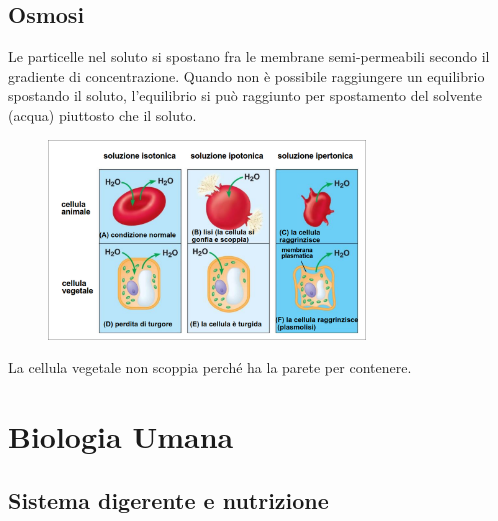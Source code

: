 \documentclass[a4paper]{article}
\begin{document}
\pagebreak

\subsection{Osmosi}

Le particelle nel soluto si spostano fra le membrane semi-permeabili secondo il gradiente
di concentrazione. Quando non è possibile raggiungere un equilibrio spostando il soluto,
l'equilibrio si può raggiunto per spostamento del solvente (acqua) piuttosto che il soluto.



\begin{figure}[th]
    \centering
    \includegraphics[width=0.75\textwidth]{./equilibrio_idrico.png}
\end{figure}

La cellula vegetale non scoppia perché ha la parete per contenere.

\pagebreak

\section{Biologia Umana}

\subsection{Sistema digerente e nutrizione}
\end{document}
